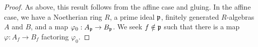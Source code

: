 \begin{proof}
	As above, this result follows from the affine case and gluing. In the affine case, we have a Noetherian ring $R$, a prime ideal $\mathfrak{p}$, finitely generated $R$-algebras $A$ and $B$, and a map $\varphi_0 : A_{\mathfrak{p}} \to B_{\mathfrak{p}}$. We seek $f \notin \mathfrak{p}$ such that there is a map $\varphi : A_f \to B_f$ factoring $\varphi_0$.
\end{proof}
